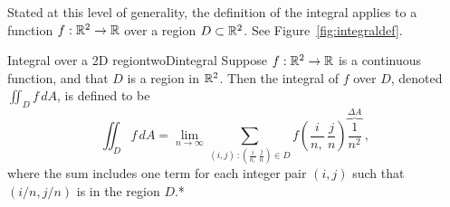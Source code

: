 \documentclass[svgnames]{report}
\begin{document}
  Stated at this level of generality, the definition of the integral
  applies to a function $f: \mathbb{R}^2 \to \mathbb{R}$ over a region $D
  \subset \mathbb{R}^2$. See Figure~\ref{fig:integraldef}. 
  \begin{defn}{Integral over a 2D region}{twoDintegral}
    Suppose $f: \mathbb{R}^2 \to \mathbb{R}$ is a continuous function, and that $D$ is a region in
    $\mathbb{R}^2$. Then the integral of $f$ over $D$, denoted
    $\iint_D f \, dA$, is defined to be
    \begin{equation} \label{eq:def2D}
      \iint_D f \, dA = \lim_{n\to\infty} \sum_{(i,j) \, : \left(\frac{i}{n,} \,\frac{j}{n}\right) \in D}
      f\left(\frac{i}{n,}\,\frac{j}{n}\right)
      \overbrace{\frac{1}{n^2}}^{\Delta A} \:,  
    \end{equation}
    where the sum includes one term for each integer pair $(i,j)$ such
    that $(i/n,j/n)$ is in the region $D$.*   
  \end{defn}
\end{document}
